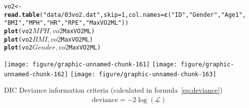 \documentclass[12pt,letterpaper,oneside]{article}\usepackage{graphicx, color}
\makeatletter
\newcommand{\hlfunctioncall}[1]{\textcolor[rgb]{0.501960784313725,0,0.329411764705882}{\textbf{#1}}}%
\newcommand{\hlstring}[1]{\textcolor[rgb]{0.6,0.6,1}{#1}}%
\newenvironment{kframe}{%
 \def\at@end@of@kframe{}%
 \ifinner\ifhmode%
  \def\at@end@of@kframe{\end{minipage}}%
  \begin{minipage}{\columnwidth}%
 \fi\fi%
 \def\FrameCommand##1{\hskip\@totalleftmargin \hskip-\fboxsep
 \colorbox{shadecolor}{##1}\hskip-\fboxsep
     \hskip-\linewidth \hskip-\@totalleftmargin \hskip\columnwidth}%
 \MakeFramed {\advance\hsize-\width
   \@totalleftmargin\z@ \linewidth\hsize
   \@setminipage}}%
 {\par\unskip\endMakeFramed%
 \at@end@of@kframe}
\newenvironment{knitrout}{}{} %
\makeatother
\begin{document}
\begin{knitrout}\scriptsize
{}\color{fgcolor}\begin{kframe}
\begin{alltt}
vo2 <- \hlfunctioncall{read.table}(\hlstring{"data/03vo2.dat"}, skip = 1, col.names = \hlfunctioncall{c}(\hlstring{"ID"}, \hlstring{"Gender"}, \hlstring{"Age1"}, 
    \hlstring{"BMI"}, \hlstring{"MPH"}, \hlstring{"HR"}, \hlstring{"RPE"}, \hlstring{"MaxVO2ML"}))
\hlfunctioncall{plot}(vo2$MPH, vo2$MaxVO2ML)
\hlfunctioncall{plot}(vo2$BMI, vo2$MaxVO2ML)
\hlfunctioncall{plot}(vo2$Gender, vo2$MaxVO2ML)
\end{alltt}
\end{kframe}

{\centering \texttt{[image: figure/graphic-unnamed-chunk-161]} 
\texttt{[image: figure/graphic-unnamed-chunk-162]} 
\texttt{[image: figure/graphic-unnamed-chunk-163]} 

}



\end{knitrout}



DIC Deviance information criteria (calculated in formula~\ref{eq:deviance})
\begin{align} \label{eq:deviance}
    \text{deviance} = -2\log(\mathcal{L})
\end{align}
\end{document}
